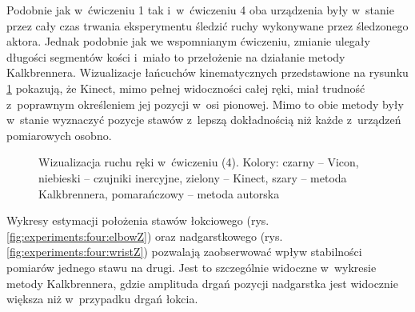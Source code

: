 Podobnie jak w~ćwiczeniu 1 tak i~w~ćwiczeniu 4 oba urządzenia były w~stanie przez cały czas trwania eksperymentu śledzić ruchy wykonywane przez śledzonego aktora. Jednak podobnie jak we wspomnianym ćwiczeniu, zmianie ulegały długości segmentów kości i~miało to przełożenie na działanie metody Kalkbrennera. Wizualizacje łańcuchów kinematycznych przedstawione na rysunku \ref{fig:experiments:four} pokazują, że Kinect, mimo pełnej widoczności całej ręki, miał trudność z~poprawnym określeniem jej pozycji w~osi pionowej. Mimo to obie metody były w~stanie wyznaczyć pozycje stawów z~lepszą dokładnością niż każde z~urządzeń pomiarowych osobno.
\begin{figure}[!htb]
	\captionsetup{singlelinecheck=off}
	\centering
	\caption[Wizualizacja ruchu ręki w~ćwiczeniu (4)]{Wizualizacja ruchu ręki w~ćwiczeniu (4).  Kolory: czarny -- Vicon, niebieski -- czujniki inercyjne, zielony -- Kinect, szary -- metoda Kalkbrennera, pomarańczowy -- metoda autorska}	
	\label{fig:experiments:four}
\end{figure}

Wykresy estymacji położenia stawów łokciowego (rys. \ref{fig:experiments:four:elbowZ}) oraz nadgarstkowego (rys. \ref{fig:experiments:four:wristZ}) pozwalają zaobserwować wpływ stabilności pomiarów jednego stawu na drugi. Jest to szczególnie widoczne w~wykresie metody Kalkbrennera, gdzie amplituda drgań pozycji nadgarstka jest widocznie większa niż w~przypadku drgań łokcia. 

